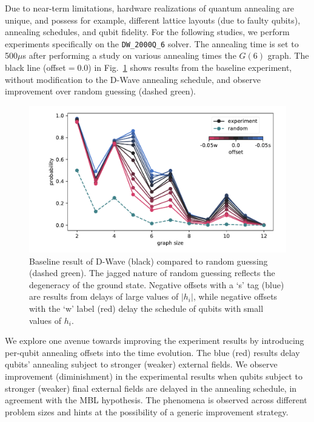 \documentclass[10pt]{iopart}
\begin{document}
Due to near-term limitations, hardware realizations of quantum annealing are unique, and possess for example, different lattice layouts (due to faulty qubits), annealing schedules, and qubit fidelity. For the following studies, we perform experiments specifically on the \texttt{DW\_2000Q\_6} solver. The annealing time is set to 500$\mu$s after performing a study on various annealing times the $G(6)$ graph. The black line (offset$=0.0$) in Fig.~\ref{fig:baseline} shows results from the baseline experiment, without modification to the D-Wave annealing schedule, and observe improvement over random guessing (dashed green).

\begin{figure}
	\centering
	\includegraphics[width=\columnwidth]{./new_figures/DWave_scaling.pdf}
	\caption{Baseline result of D-Wave (black) compared to random guessing (dashed green). The jagged nature of random guessing reflects the degeneracy of the ground state. Negative offsets with a `s' tag (blue) are results from delays of large values of $|h_i|$, while negative offsets with the `w' label (red) delay the schedule of qubits with small values of $h_i$.}
	\label{fig:baseline}
\end{figure}

We explore one avenue towards improving the experiment results by introducing per-qubit annealing offsets into the time evolution.
The blue (red) results delay qubits' annealing subject to stronger (weaker) external fields. We observe improvement (diminishment) in the experimental results when qubits subject to stronger (weaker) final external fields are delayed in the annealing schedule, in agreement with the MBL hypothesis. The phenomena is observed across different problem sizes and hints at the possibility of a generic improvement strategy.
\end{document}
